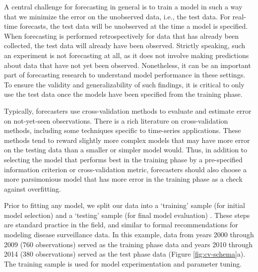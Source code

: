 \documentclass[a4paper]{article}
\begin{document}
A central challenge for forecasting in general is to train a model in such a way that we minimize the error on the unobserved data, i.e., the test data.
For real-time forecasts, the test data will be unobserved at the time a model is specified.
When forecasting is performed retrospectively for data that has already been collected, the test data will already have been observed. 
Strictly speaking, such an experiment is not forecasting at all, as it does not involve making predictions about data that have not yet been observed.
Nonetheless, it can be an important part of forecasting research to understand model performance in these settings.
To ensure the validity and generalizability of such findings, it is critical to only use the test data once the models have been specified from the training phase.

Typically, forecasters use cross-validation methods to evaluate and estimate error on not-yet-seen observations.\cite{Hastie2009}
There is a rich literature on cross-validation methods, including some techniques specific to time-series applications.\cite{Bergmeir2018}
These methods tend to reward slightly more complex models that may have more error on the testing data than a smaller or simpler model would.\cite{Shao1993}
Thus, in addition to selecting the model that performs best in the training phase by a pre-specified information criterion or cross-validation metric, forecasters should also choose a more parsimonious model that has more error in the training phase as a check against overfitting.\cite{Ng1997}

Prior to fitting any model, we split our data into a `training' sample (for initial model selection) and a `testing' sample (for final model evaluation) \cite{Stone1974, Hastie2009}.
These steps are standard practice in the field, and similar to formal recommendations for modeling disease surveillance data.\cite{althouse2015enhancing}
In this example, data from years 2000 through 2009 (760 observations) served as the training phase data and years 2010 through 2014 (380 observations) served as the test phase data (Figure \ref{fig:cv-schema}a).
The training sample is used for model experimentation and parameter tuning.  
\end{document}
